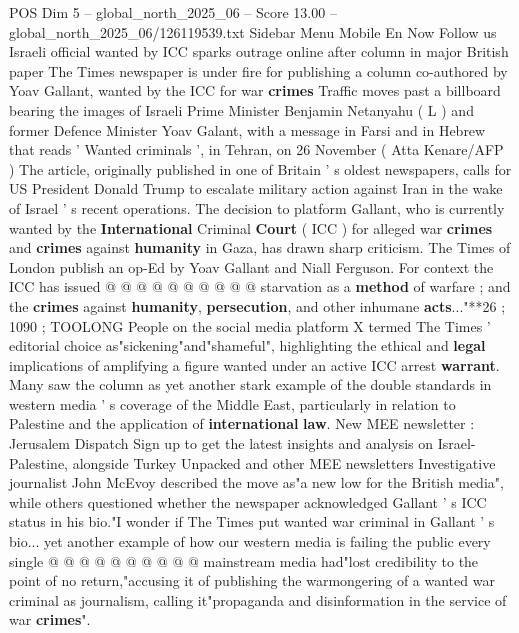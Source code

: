 \begin{textsample}{POS Dim 5 – global\_north\_2025\_06 – Score 13.00 – global\_north\_2025\_06/126119539.txt}  \label{ex:f5_pos_088}
Sidebar Menu Mobile En Now Follow us Israeli official wanted by ICC sparks outrage online after column in major British paper The Times newspaper is under fire for publishing a column co-authored by Yoav Gallant, wanted by the ICC for war \textbf{crimes} Traffic moves past a billboard bearing the images of Israeli Prime Minister Benjamin Netanyahu ( L ) and former Defence Minister Yoav Galant, with a message in Farsi and in Hebrew that reads ' Wanted criminals ', in Tehran, on 26 November ( Atta Kenare/AFP ) The article, originally published in one of Britain ' s oldest newspapers, calls for US President Donald Trump to escalate military action against Iran in the wake of Israel ' s recent operations.
The decision to platform Gallant, who is currently wanted by the \textbf{International} Criminal \textbf{Court} ( ICC ) for alleged war \textbf{crimes} and \textbf{crimes} against \textbf{humanity} in Gaza, has drawn sharp criticism.
The Times of London publish an op-Ed by Yoav Gallant and Niall Ferguson.
For context the ICC has issued @ @ @ @ @ @ @ @ @ @ starvation as a \textbf{method} of warfare ; and the \textbf{crimes} against \textbf{humanity}, \textbf{persecution}, and other inhumane \textbf{acts}..."**26 ; 1090 ; TOOLONG People on the social media platform X termed The Times ' editorial choice as"sickening"and"shameful", highlighting the ethical and \textbf{legal} implications of amplifying a figure wanted under an active ICC arrest \textbf{warrant}.
Many saw the column as yet another stark example of the double standards in western media ' s coverage of the Middle East, particularly in relation to Palestine and the application of \textbf{international} \textbf{law}.
New MEE newsletter : Jerusalem Dispatch Sign up to get the latest insights and analysis on Israel-Palestine, alongside Turkey Unpacked and other MEE newsletters Investigative journalist John McEvoy described the move as"a new low for the British media", while others questioned whether the newspaper acknowledged Gallant ' s ICC status in his bio."I wonder if The Times put wanted war criminal in Gallant ' s bio... yet another example of how our western media is failing the public every single @ @ @ @ @ @ @ @ @ @ mainstream media had"lost credibility to the point of no return,"accusing it of publishing the warmongering of a wanted war criminal as journalism, calling it"propaganda and disinformation in the service of war \textbf{crimes}".

\end{textsample}
